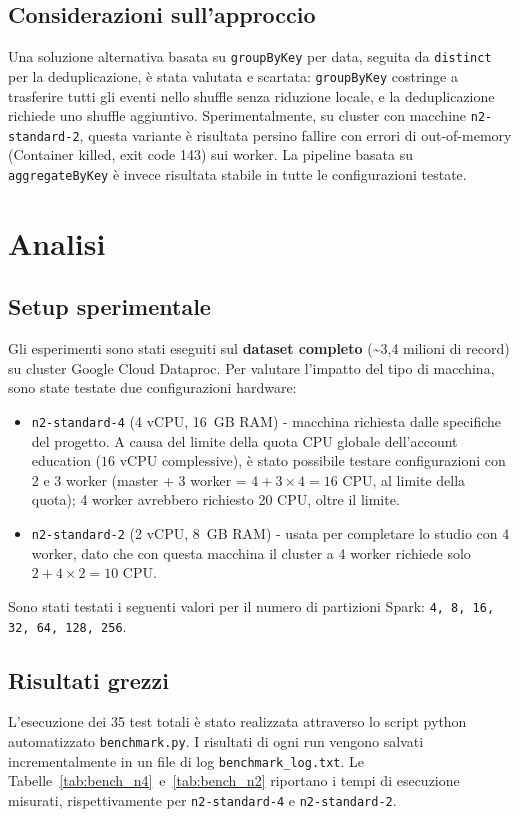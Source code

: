 \documentclass[11pt,a4paper]{article}
\begin{document}
\subsection{Considerazioni sull'approccio}
Una soluzione alternativa basata su \texttt{groupByKey} per data, seguita
da \texttt{distinct} per la deduplicazione, è stata valutata e scartata:
\texttt{groupByKey} costringe a trasferire tutti gli eventi nello shuffle
senza riduzione locale, e la deduplicazione richiede uno shuffle
aggiuntivo. Sperimentalmente, su cluster con macchine
\texttt{n2-standard-2}, questa variante è risultata persino fallire con
errori di out-of-memory (Container killed, exit code 143) sui worker.
La pipeline basata su \texttt{aggregateByKey} è invece risultata stabile
in tutte le configurazioni testate.

\section{Analisi}

\subsection{Setup sperimentale}
Gli esperimenti sono stati eseguiti sul \textbf{dataset completo}
(\textasciitilde 3{,}4 milioni di record) su cluster Google Cloud Dataproc.
Per valutare l'impatto del tipo di macchina, sono state testate due
configurazioni hardware:
\begin{itemize}
    \item[-] \texttt{n2-standard-4} (4 vCPU, 16~GB RAM) - macchina richiesta
    dalle specifiche del progetto. A causa del limite della quota CPU
    globale dell'account education ($16$ vCPU complessive), è stato
    possibile testare configurazioni con 2 e 3 worker (master + 3 worker
    = $4 + 3 \times 4 = 16$ CPU, al limite della quota); 4 worker
    avrebbero richiesto 20 CPU, oltre il limite.
    \item[-] \texttt{n2-standard-2} (2 vCPU, 8~GB RAM) - usata per
    completare lo studio con 4 worker, dato che con questa macchina il
    cluster a 4 worker richiede solo $2 + 4 \times 2 = 10$ CPU.
\end{itemize}
Sono stati testati i seguenti valori per il numero di partizioni Spark: \texttt{4, 8, 16, 32, 64, 128, 256}.

\subsection{Risultati grezzi}
L'esecuzione dei 35 test totali è stato realizzata attraverso lo script python automatizzato \texttt{benchmark.py}. I risultati di ogni run vengono salvati incrementalmente in un file di log \texttt{benchmark\_log.txt}.
Le Tabelle~\ref{tab:bench_n4}~e~\ref{tab:bench_n2} riportano i tempi di
esecuzione misurati, rispettivamente per \texttt{n2-standard-4} e
\texttt{n2-standard-2}.
\end{document}

